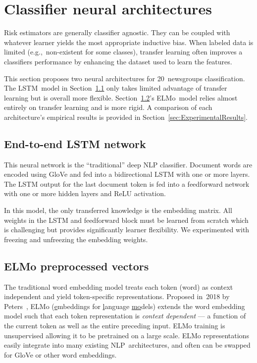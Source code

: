 \section{Classifier neural architectures}\label{sec:Architectures}

Risk estimators are generally classifier agnostic.  They can be coupled with whatever learner yields the most appropriate inductive bias. When labeled data is limited (e.g.,~non-existent for some classes), transfer learning often improves a classifiers performance by enhancing the dataset used to learn the features.

This section proposes two neural architectures for 20~newsgroups classification.  The LSTM~model in Section~\ref{sec:Architectures:LSTM} only takes limited advantage of transfer learning but is overall more flexible.  Section~\ref{sec:Architectures:ELMo}'s ELMo~model relies almost entirely on transfer learning and is more rigid. A comparison of each architecture's empirical results is provided in Section~\ref{sec:ExperimentalResults}.

\subsection{End-to-end LSTM network}\label{sec:Architectures:LSTM}

This neural network is the ``traditional'' deep NLP classifier. Document words are encoded using GloVe and fed into a bidirectional LSTM with one or more layers.  The LSTM output for the last document token is fed into a feedforward network with one or more hidden layers and ReLU activation.

In this model, the only transferred knowledge is the embedding matrix. All weights in the LSTM and feedforward block must be learned from scratch which is challenging but provides significantly learner flexibility.  We experimented with freezing and unfreezing the embedding weights.

\subsection{ELMo preprocessed vectors}\label{sec:Architectures:ELMo}

The traditional word embedding model treats each token (word) as context independent and yield token-specific representations. Proposed in~2018 by Peters\etal~\cite{Peters:2018}, ELMo (\underline{e}mbeddings for \underline{l}anguage \underline{mo}dels) extends the word embedding model such that each token representation is \textit{context dependent} --- a function of the current token as well as the entire preceding input.  ELMo training is unsupervised allowing it to be pretrained on a large scale.  ELMo representations easily integrate into many existing NLP~architectures, and often can be swapped for GloVe or other word embeddings.

